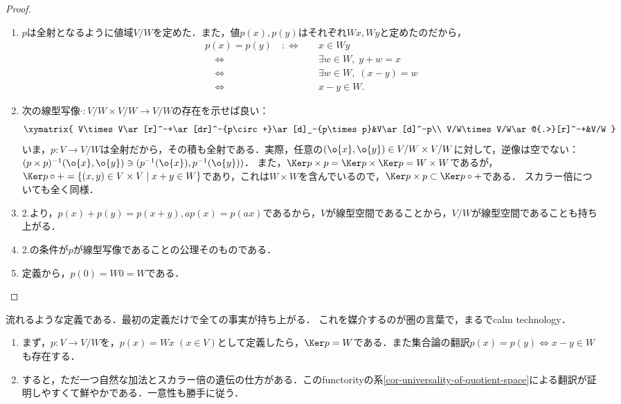 \documentclass[uplatex, dvipdfmx]{jsreport}
\begin{document}
\begin{proof}\mbox{}
    \begin{enumerate}
        \item $p$は全射となるように値域$V/W$を定めた．また，値$p(x),p(y)$はそれぞれ$Wx,Wy$と定めたのだから，
        \begin{align*}
            p(x)=p(y)\quad:\Leftrightarrow\quad&x\in Wy\\
            \quad\Leftrightarrow\quad&\exists w\in W,\;y+w=x\\
            \quad\Leftrightarrow\quad&\exists w\in W,\; (x-y)=w\\
            \quad\Leftrightarrow\quad&x-y\in W.
        \end{align*}
        \item 次の線型写像$\cdot:V/W\times V/W\to V/W$の存在を示せば良い：
        \[\xymatrix{
            V\times V\ar[r]^-+\ar[dr]^-{p\circ +}\ar[d]_-{p\times p}&V\ar[d]^-p\\
            V/W\times V/W\ar@{.>}[r]^-+&V/W
        }\]
        いま，$p:V\to V/W$は全射だから，その積も全射である．実際，任意の$(\o{x},\o{y})\in V/W\times V/W$に対して，逆像は空でない：$(p\times p)^{-1}(\o{x},\o{y})\ni (p^{-1}(\o{x}),p^{-1}(\o{y}))$．
        また，$\Ker p\times p=\Ker p\times\Ker p=W\times W$であるが，$\Ker p\circ +=\{(x,y)\in V\times V\mid x+y\in W\}$であり，これは$W\times W$を含んでいるので，$\Ker p\times p\subset\Ker p\circ +$である．
        スカラー倍についても全く同様．
        \item 2.より，$p(x)+p(y)=p(x+y),ap(x)=p(ax)$であるから，$V$が線型空間であることから，$V/W$が線型空間であることも持ち上がる．
        \item 2.の条件が$p$が線型写像であることの公理そのものである．
        \item 定義から，$p(0)=W0=W$である．
    \end{enumerate}
\end{proof}
\begin{remarks}
    流れるような定義である．最初の定義だけで全ての事実が持ち上がる．
    これを媒介するのが圏の言葉で，まるでcalm technology．
    \begin{enumerate}
        \item まず，$p:V\to V/W$を，$p(x)=Wx\;(x\in V)$として定義したら，$\Ker p=W$である．また集合論の翻訳$p(x)=p(y)\Leftrightarrow x-y\in W$も存在する．
        \item すると，ただ一つ自然な加法とスカラー倍の遺伝の仕方がある．このfunctorityの系\ref{cor-universality-of-quotient-space}による翻訳が証明しやすくて鮮やかである．一意性も勝手に従う．
    \end{enumerate}
\end{remarks}
\end{document}

